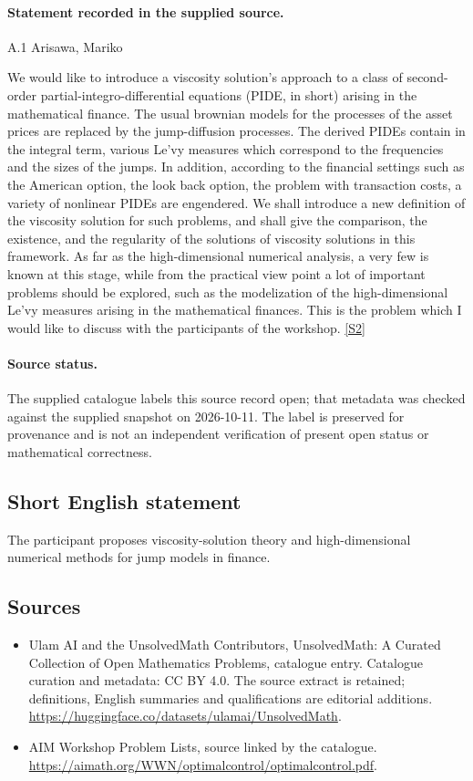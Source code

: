 \documentclass[11pt]{article}
\begin{document}
\paragraph{Statement recorded in the supplied source.}
A.1 Arisawa, Mariko

We would like to introduce a viscosity solution's approach to a class of second-order partial-integro-differential equations (PIDE, in short) arising in the mathematical finance. The usual brownian models for the processes of the asset prices are replaced by the jump-diffusion processes. The derived PIDEs contain in the integral term, various Le'vy measures which correspond to the frequencies and the sizes of the jumps. In addition, according to the financial settings such as the American option, the look back option, the problem with transaction costs, a variety of nonlinear PIDEs are engendered. We shall introduce a new definition of the viscosity solution for such problems, and shall give the comparison, the existence, and the regularity of the solutions of viscosity solutions in this framework. As far as the high-dimensional numerical analysis, a very few is known at this stage, while from the practical view point a lot of important problems should be explored, such as the modelization of the high-dimensional Le'vy measures arising in the mathematical finances. This is the problem which I would like to discuss with the participants of the workshop. \href{https://aimath.org/WWN/optimalcontrol/optimalcontrol.pdf}{[S2]}
\paragraph{Source status.}
The supplied catalogue labels this source record open; that metadata was checked against the supplied snapshot on 2026-10-11. The label is preserved for provenance and is not an independent verification of present open status or mathematical correctness.
\subsection{Short English statement}
The participant proposes viscosity-solution theory and high-dimensional numerical methods for jump models in finance.
\subsection{Sources}
\begin{itemize}
\item[S1] Ulam AI and the UnsolvedMath Contributors, UnsolvedMath: A Curated Collection of Open Mathematics Problems, catalogue entry. Catalogue curation and metadata: CC BY 4.0. The source extract is retained; definitions, English summaries and qualifications are editorial additions.
\url{https://huggingface.co/datasets/ulamai/UnsolvedMath}.
\item[S2] AIM Workshop Problem Lists, source linked by the catalogue.
\url{https://aimath.org/WWN/optimalcontrol/optimalcontrol.pdf}.
\end{itemize}
\end{document}
